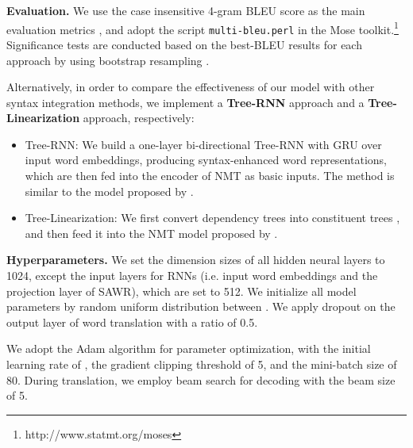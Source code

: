 \documentclass[11pt,a4paper]{article}
\begin{document}
\begin{CJK}{UTF8}{gbsn}
\textbf{Evaluation.}
We use the case insensitive 4-gram BLEU score as the main evaluation metrics  \cite{papineni-EtAl:2002:ACL},
and adopt the script \texttt{multi-bleu.perl} in the Mose toolkit.\footnote{http://www.statmt.org/moses}
Significance tests are conducted based on the best-BLEU results for each approach by using bootstrap resampling \cite{koehn:2004:EMNLP}.


Alternatively, in order to compare the effectiveness of our model with other syntax integration methods,
we implement a \textbf{Tree-RNN} approach and a \textbf{Tree-Linearization} approach,
respectively:
\begin{itemize}
  \item Tree-RNN: We build a one-layer bi-directional Tree-RNN with GRU over input word embeddings,
  producing syntax-enhanced word representations, which are then fed into the encoder of NMT as basic inputs.
  The method is similar to the model proposed by .
  \item Tree-Linearization: We first convert dependency trees into constituent trees \cite{weiweisuntacl13}, and then feed it into the NMT model proposed by .
\end{itemize}




\textbf{Hyperparameters.}
We set the dimension sizes of all hidden neural layers to 1024,
except the input layers for RNNs (i.e. input word embeddings and the projection layer of SAWR),
which are set to 512.
We initialize all model parameters by random uniform distribution between .
We apply dropout on the output layer of word translation with a ratio of 0.5.

We adopt the Adam algorithm \cite{kingma2014adam} for parameter optimization, with the initial learning rate of ,
the gradient clipping threshold of 5, and the mini-batch size of 80.
During translation, we employ beam search for decoding with the beam size of 5.



\end{CJK}
\end{document}
